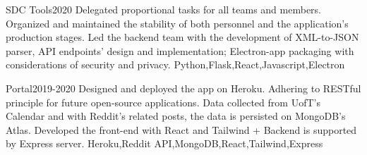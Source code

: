%
%
%


\begin{projects}
	\project
	{SDC Tools}{2020}
	{}
	{Delegated proportional tasks for all teams and members. Organized and maintained the stability of both personnel and the application's production stages. Led the backend team with the development of XML-to-JSON parser, API endpoints' design and implementation; Electron-app packaging with considerations of security and privacy.}
	{Python,Flask,React,Javascript,Electron}
				
	\project
	{Portal}{2019-2020}
	{ }
	{Designed and deployed the app on Heroku. Adhering to RESTful principle for future open-source applications. Data collected from UofT's Calendar and with Reddit's related posts, the data is persisted on MongoDB's Atlas. Developed the front-end with React and Tailwind + Backend is supported by Express server.}
	{Heroku,Reddit API,MongoDB,React,Tailwind,Express}

\end{projects}
